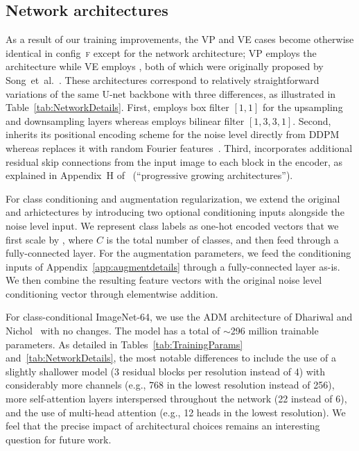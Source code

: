 \subsection{Network architectures}
\label{app:architectures}

\tabNetworkDetails

As a result of our {training} improvements, the VP and VE cases become otherwise identical in config~\textsc{f} except for the network architecture; VP employs the \ddpmpp{} architecture while VE employs \ncsnpp{}, both of which were originally proposed by Song~et~al.~\cite{Song2021sde}.
These architectures correspond to relatively straightforward variations of the same U-net backbone with {three differences, as illustrated in Table~\ref{tab:NetworkDetails}}.
First, \ddpmpp{} employs box filter $[1, 1]$ for the upsampling and downsampling layers whereas \ncsnpp{} employs bilinear filter $[1, 3, 3, 1]$.
Second, \ddpmpp{} inherits its positional encoding scheme for the noise level directly from DDPM~\cite{Ho2020} whereas \ncsnpp{} replaces it with random Fourier features~\cite{Tancik2020fourier}.
Third, \ncsnpp{} incorporates additional residual skip connections from the input image to each block in the encoder, as explained in Appendix~H of~\cite{Song2021sde} (``progressive growing architectures'').

For class conditioning and augmentation regularization, we extend the original \ddpmpp{} and \ncsnpp{} arhictectures by introducing two optional conditioning inputs alongside the noise level input.
We represent class labels as one-hot encoded vectors that we first scale by , where $C$ is the total number of classes, and then feed through a fully-connected layer.
For the augmentation parameters, we feed the conditioning inputs of Appendix~\ref{app:augmentdetails} through a fully-connected layer as-is.
We then combine the resulting feature vectors with the original noise level conditioning vector through elementwise addition.

{
For class-conditional ImageNet-64, we use the ADM architecture of Dhariwal and Nichol~\cite{Dhariwal2021} with no changes.
The model has a total of $\sim$296 million trainable parameters.
As detailed in Tables~\ref{tab:TrainingParams} and~\ref{tab:NetworkDetails}, the most notable differences to \ddpmpp{} include the use of a slightly shallower model (3 residual blocks per resolution instead of 4) with considerably more channels (e.g., 768 in the lowest resolution instead of 256), more self-attention layers interspersed throughout the network (22 instead of 6), and the use of multi-head attention (e.g., 12 heads in the lowest resolution).
We feel that the precise impact of architectural choices remains an interesting question for future work.
}


